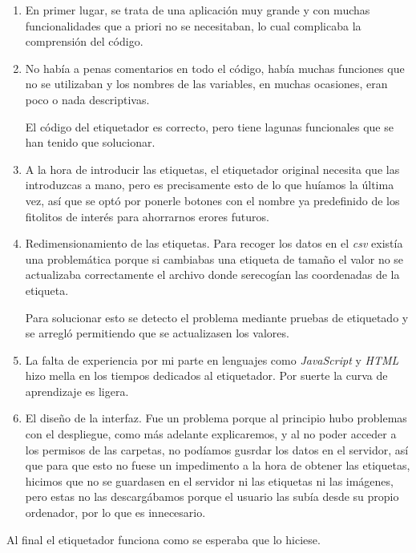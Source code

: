 \begin{enumerate}
	\item En primer lugar, se trata de una aplicación muy grande y con muchas funcionalidades que a priori no se necesitaban, lo cual complicaba la comprensión del código.
	
	\item No había a penas comentarios en todo el código, había muchas funciones que no se utilizaban y los nombres de las variables, en muchas ocasiones, eran poco o nada descriptivas. 
	
	El código del etiquetador es correcto, pero tiene lagunas funcionales que se han tenido que solucionar.
	
	\item A la hora de introducir las etiquetas, el etiquetador original necesita que las introduzcas a mano, pero es precisamente esto de lo que huíamos la última vez, así que se optó por ponerle botones con el nombre ya predefinido de los fitolitos de interés para ahorrarnos erores futuros.
	
	\item Redimensionamiento de las etiquetas. Para recoger los datos en el \textit{csv} existía una problemática porque si cambiabas una etiqueta de tamaño el valor no se actualizaba correctamente el archivo donde serecogían las coordenadas de la etiqueta.
	
	Para solucionar esto se detecto el problema mediante pruebas de etiquetado y se arregló permitiendo que se actualizasen los valores.
	
	\item La falta de experiencia por mi parte en lenguajes como \textit{JavaScript} y \textit{HTML} hizo mella en los tiempos dedicados al etiquetador. Por suerte la curva de aprendizaje es ligera.
	
	\item El diseño de la interfaz. Fue un problema porque al principio hubo problemas con el despliegue, como más adelante explicaremos, y al no poder acceder a los permisos de las carpetas, no podíamos gusrdar los datos en el servidor, así que para que esto no fuese un impedimento a la hora de obtener las etiquetas, hicimos que no se guardasen en el servidor ni las etiquetas ni las imágenes, pero estas no las descargábamos porque el usuario las subía desde su propio ordenador, por lo que es innecesario.
\end{enumerate}

Al final el etiquetador funciona como se esperaba que lo hiciese.

